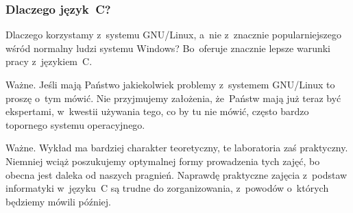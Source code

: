 \documentclass[10pt,t]{beamer}
\begin{document}
\begin{frame}
  \frametitle{Dlaczego język~C?}


  Dlaczego korzystamy z~systemu GNU/Linux, a~nie z~znacznie
  popularniejszego wśród normalny ludzi systemu Windows? Bo~oferuje
  znacznie lepsze warunki pracy z~językiem~C.

  \alert{Ważne.} Jeśli mają Państwo jakiekolwiek problemy z~systemem
  GNU/Linux to proszę o~tym \alert{mówić}. Nie przyjmujemy założenia,
  że~Państw mają już teraz być ekspertami, w~kwestii używania tego, co by
  tu nie mówić, często bardzo topornego systemu operacyjnego.

  \alert{Ważne.} Wykład ma bardziej charakter teoretyczny, te laboratoria
  zaś praktyczny. Niemniej wciąż poszukujemy optymalnej formy prowadzenia
  tych zajęć, bo obecna jest daleka od naszych pragnień. Naprawdę
  praktyczne zajęcia z~podstaw informatyki w~języku~C są trudne do
  zorganizowania, z~powodów o~których będziemy mówili później.

\end{frame}
\end{document}
